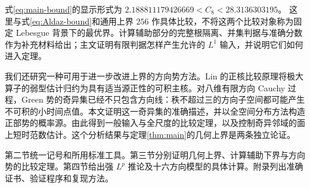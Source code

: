 式\eqref{eq:main-bound}的显示形式为
$2.188811179426669<C_8<28.3136303195$。
这里与式\eqref{eq:Aldaz-bound}和通用上界 $256$ 作具体比较，不将这两个比较对象称为固定 Lebesgue 背景下的最优界。计算辅助部分的完整根隔离、并集判据与准确分数作为补充材料给出；主文证明有限判据怎样产生允许的 $L^1$ 输入，并说明它们如何进入定理。

我们还研究一种可用于进一步改进上界的方向势方法。Lin 的正核比较原理\cite{Lin2026}将极大算子的弱型估计归约为具有适当源正性的可积主核。对八维有限方向 Cauchy 过程，Green 势的奇异集已经不只包含方向线：秩不超过三的方向子空间都可能产生不可积的小时间点值。本文证明这一奇异集的准确描述，并以全空间分布方法构造正部势的概率源。由此得到一般输入与全尺度的比较定理，以及控制奇异邻域的面上短时范数估计。这个分析结果与定理\ref{thm:main}的几何上界是两条独立论证。

第二节统一记号和所用标准工具。第三节分别证明几何上界、计算辅助下界与方向势的比较定理。第四节给出强 $L^p$ 推论及十六方向模型的具体计算。附录列出准确证书、验证程序和复现方法。
